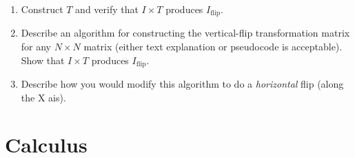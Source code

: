 \documentclass[11pt]{article}
\begin{document}
\begin{enumerate}[label=\arabic*., resume]
\begin{enumerate}[label=(\alph*)]
            \item Construct $T$ and verify that $I\times T$ produces $I_{\text{flip}}$.

            
            \item Describe an algorithm for constructing the vertical-flip transformation matrix for any $N\times N$ matrix (either text explanation or pseudocode is acceptable). Show that $I\times T$ produces $I_{\text{flip}}$.

            
            \item Describe how you would modify this algorithm to do a \textit{horizontal} flip (along the X ais).

            
        \end{enumerate}
    
    
\end{enumerate}
\newpage




\section*{Calculus}
\end{document}
